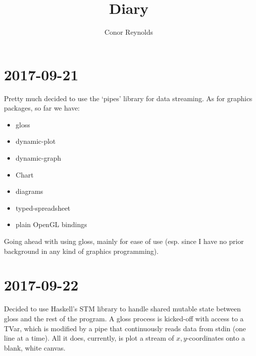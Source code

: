 \documentclass[a5paper,11pt]{article}
\title{Diary}
\author{Conor Reynolds}
\date{}
\begin{document}
	\maketitle
	
	\section*{2017-09-21}
	
	Pretty much decided to use the `pipes' library for data streaming. As for graphics packages, so far we have:
	
	\begin{itemize}
		\item gloss
		\item dynamic-plot
		\item dynamic-graph
		\item Chart
		\item diagrams
		\item typed-spreadsheet
		\item plain OpenGL bindings
	\end{itemize}
	
	Going ahead with using gloss, mainly for ease of use (esp. since I have no prior background in any kind of graphics programming).
	
	\section*{2017-09-22}
	
	Decided to use Haskell's STM library to handle shared mutable state between gloss and the rest of the program. A gloss process is kicked-off with access to a TVar, which is modified by a pipe that continuously reads data from stdin (one line at a time). All it does, currently, is plot a stream of $ x,y $-coordinates onto a blank, white canvas.
	
\end{document}
